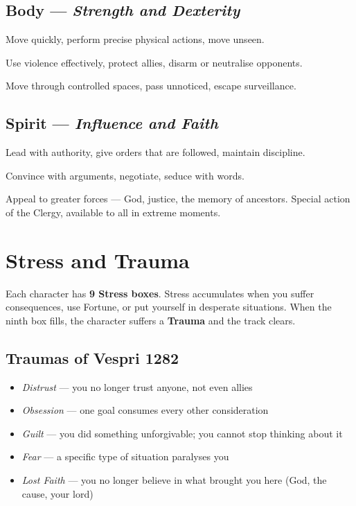 \subsection{Body --- \textit{Strength and Dexterity}}

\begin{description}[leftmargin=2em, style=nextline]
  \item[\cinzel Act] Move quickly, perform precise physical actions,
    move unseen.
  \item[\cinzel Fight] Use violence effectively, protect allies, disarm
    or neutralise opponents.
  \item[\cinzel Manoeuvre] Move through controlled spaces, pass unnoticed,
    escape surveillance.
\end{description}

\subsection{Spirit --- \textit{Influence and Faith}}

\begin{description}[leftmargin=2em, style=nextline]
  \item[\cinzel Command] Lead with authority, give orders that are followed,
    maintain discipline.
  \item[\cinzel Persuade] Convince with arguments, negotiate, seduce with words.
  \item[\cinzel Invoke] Appeal to greater forces --- God, justice, the memory
    of ancestors. Special action of the Clergy, available to all in extreme moments.
\end{description}

\secsep

\section{Stress and Trauma}

Each character has \textbf{9 Stress boxes}. Stress accumulates when
you suffer consequences, use Fortune, or put yourself in desperate
situations. When the ninth box fills, the character suffers a
\textbf{Trauma} and the track clears.

\subsection{Traumas of Vespri 1282}

\begin{itemize}[nosep]
  \item \textit{Distrust} --- you no longer trust anyone, not even allies
  \item \textit{Obsession} --- one goal consumes every other consideration
  \item \textit{Guilt} --- you did something unforgivable; you cannot stop
    thinking about it
  \item \textit{Fear} --- a specific type of situation paralyses you
  \item \textit{Lost Faith} --- you no longer believe in what brought you here
    (God, the cause, your lord)
\end{itemize}

